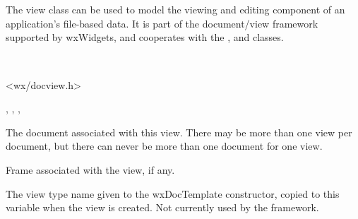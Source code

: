 
\section{}\label{wxview}

The view class can be used to model the viewing and editing component of
an application's file-based data. It is part of the document/view framework supported by wxWidgets,
and cooperates with the , 
and  classes.


\\


<wx/docview.h>


, , ,\rtfsp
{}


\label{wxviewmviewdocument}


The document associated with this view. There may be more than one view per
document, but there can never be more than one document for one view.

\label{wxviewmviewframe}


Frame associated with the view, if any.

\label{wxviewmviewtypename}


The view type name given to the wxDocTemplate constructor, copied to this
variable when the view is created. Not currently used by the framework.

